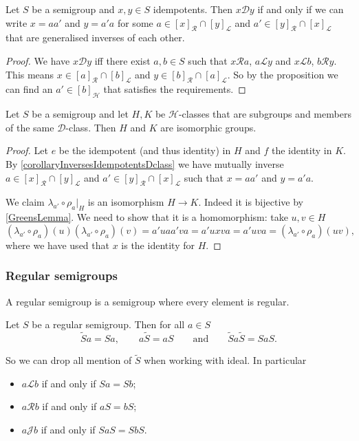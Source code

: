 \begin{corollary} \label{corollaryInversesIdempotentsDclass}
Let $S$ be a semigroup and $x,y\in S$ idempotents. Then $x\mathcal{D}y$ \textup{if and only if} we can write $x = aa'$ and $y = a'a$ for some $a\in [x]_\mathcal{R}\cap [y]_\mathcal{L}$ and $a'\in [y]_\mathcal{R}\cap [x]_\mathcal{L}$ that are generalised inverses of each other.
\end{corollary}
\begin{proof}
We have $x\mathcal{D}y$ iff there exist $a,b\in S$ such that $x\mathcal{R}a$, $a\mathcal{L}y$ and $x\mathcal{L}b$, $b\mathcal{R}y$. This means $x\in [a]_\mathcal{R}\cap [b]_\mathcal{L}$ and $y\in [b]_\mathcal{R}\cap [a]_\mathcal{L}$. So by the proposition we can find an $a'\in [b]_\mathcal{H}$ that satisfies the requirements.
\end{proof}

\begin{proposition}
Let $S$ be a semigroup and let $H,K$ be $\mathcal{H}$-classes that are subgroups and members of the same $\mathcal{D}$-class. Then $H$ and $K$ are isomorphic groups.
\end{proposition}
\begin{proof}
Let $e$ be the idempotent (and thus identity) in $H$ and $f$ the identity in $K$. By \ref{corollaryInversesIdempotentsDclass} we have mutually inverse $a\in [x]_\mathcal{R}\cap [y]_\mathcal{L}$ and $a'\in [y]_\mathcal{R}\cap [x]_\mathcal{L}$ such that $x = aa'$ and $y = a'a$.

We claim $\lambda_{a'}\circ\rho_{a}|_H$ is an isomorphism $H\to K$. Indeed it is bijective by \ref{GreensLemma}. We need to show that it is a homomorphism: take $u,v\in H$
\[ (\lambda_{a'}\circ\rho_{a})(u)(\lambda_{a'}\circ\rho_{a})(v) = a'uaa'va = a'uxva = a'uva = (\lambda_{a'}\circ\rho_{a})(uv), \]
where we have used that $x$ is the identity for $H$.
\end{proof}

\subsubsection{Regular semigroups}
\begin{definition}
A regular semigroup is a semigroup where every element is regular.
\end{definition}

\begin{lemma}
Let $S$ be a regular semigroup. Then for all $a\in S$
\[ \widetilde{S}a = Sa, \qquad  a\widetilde{S} = aS \qquad\text{and}\qquad \widetilde{S}a\widetilde{S} = SaS. \]
\end{lemma}
So we can drop all mention of $\widetilde{S}$ when working with ideal. In particular
\begin{itemize}
\item $a\mathcal{L}b$ if and only if $Sa = Sb$;
\item $a\mathcal{R}b$ if and only if $aS = bS$;
\item $a\mathcal{J}b$ if and only if $SaS = SbS$.
\end{itemize}

